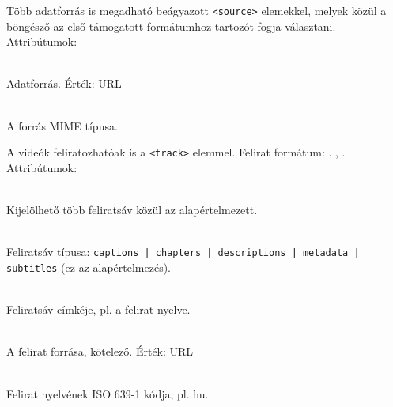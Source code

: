 \begin{frame}
  \begin{exampleblock}{}
    \footnotesize
    
  \end{exampleblock}
\end{frame}

\begin{frame}
  Több adatforrás is megadható beágyazott \texttt{<source>} elemekkel, melyek 
  közül a böngésző az első támogatott formátumhoz tartozót 
  fogja választani. Attribútumok:
  \begin{description}[m]
    \item[\texttt{<src>}] \hfill \\ Adatforrás. Érték: URL
    \item[\texttt{<type>}] \hfill \\ A forrás MIME típusa.
  \end{description}
\end{frame}

\begin{frame}
  \begin{exampleblock}{}
    \scriptsize
    
  \end{exampleblock}
\end{frame}

\begin{frame}
  A videók feliratozhatóak is a \texttt{<track>} elemmel. Felirat 
  formátum: . 
  , 
  . 
  Attribútumok:
  \begin{description}[m]
    \item[\texttt{<default>}] \hfill \\ Kijelölhető több feliratsáv 
    közül az alapértelmezett.
    \item[\texttt{<kind>}] \hfill \\ Feliratsáv típusa: 
    \texttt{captions | chapters | descriptions | metadata | 
    subtitles} (ez az alapértelmezés).
    \item[\texttt{<label>}] \hfill \\ Feliratsáv címkéje, pl. a 
    felirat nyelve.
    \item[\texttt{<src>}] \hfill \\ A felirat forrása, kötelező. 
    Érték: URL
    \item[\texttt{<srclang>}] \hfill \\ Felirat nyelvének ISO 639-1 
    kódja, pl. hu.
  \end{description}
\end{frame}

\begin{frame}
  \begin{exampleblock}{}
    \scriptsize
    
  \end{exampleblock}
\end{frame}
